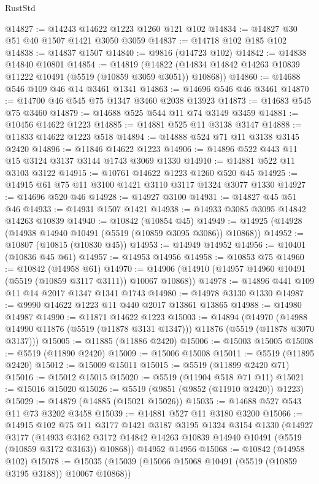 \begin{lexlean}{RustStd}
\begin{coremodule}
@14827 := @14243 @14622 @1223 @1260 @121 @102
@14834 := @14827 @30 @51 @40 @1507 @1421 @3050 @3059
@14837 := @14718 @102 @185 @102
@14838 := @14837 @1507
@14840 := @9816 (@14723 @102)
@14842 := @14838 @14840 @10801
@14854 := @14819
    (@14822 (@14834 @14842 @14263 @10839 @11222 @10491 (@5519 (@10859 @3059 @3051)) @10868))
@14860 := @14688 @546 @109 @46 @14 @3461 @1341
@14863 := @14696 @546 @46 @3461
@14870 := @14700 @46 @545 @75 @1347 @3460 @2038 @13923
@14873 := @14683 @545 @75 @3460
@14879 := @14688 @525 @544 @11 @74 @3149 @3459
@14881 := @10456 @14622 @1223
@14885 := @14881 @525 @11 @3138 @3147
@14888 := @11833 @14622 @1223 @518
@14894 := @14888 @524 @71 @11 @3138 @3145 @2420
@14896 := @11846 @14622 @1223
@14906 := @14896 @522 @443 @11 @15 @3124 @3137 @3144 @1743 @3069 @1330
@14910 := @14881 @522 @11 @3103 @3122
@14915 := @10761 @14622 @1223 @1260 @520 @45
@14925 := @14915 @61 @75 @11 @3100 @1421 @3110 @3117 @1324 @3077 @1330
@14927 := @14696 @520 @46
@14928 := @14927 @3100
@14931 := @14827 @45 @51 @46
@14933 := @14931 @1507 @1421
@14938 := @14933 @3085 @3095 @14842 @14263 @10839
@14940 := @10842 (@10854 @45)
@14949 := @14925 (@14928 (@14938 @14940 @10491 (@5519 (@10859 @3095 @3086)) @10868))
@14952 := @10807 (@10815 (@10830 @45))
@14953 := @14949 @14952
@14956 := @10401 (@10836 @45 @61)
@14957 := @14953 @14956
@14958 := @10853 @75
@14960 := @10842 (@14958 @61)
@14970 := @14906 (@14910 (@14957 @14960 @10491 (@5519 (@10859 @3117 @3111)) @10067 @10868))
@14978 := @14896 @441 @109 @11 @14 @2017 @1347 @1341 @1743
@14980 := @14978 @3130 @1330
@14987 := @9990 @14622 @1223 @11 @440 @2017 @13861 @13865
@14988 := @14980 @14987
@14990 := @11871 @14622 @1223
@15003 := @14894
    (@14970 (@14988 @14990 @11876 (@5519 (@11878 @3131 @1347))) @11876 (@5519 (@11878 @3070 @3137)))
@15005 := @11885 (@11886 @2420)
@15006 := @15003 @15005
@15008 := @5519 (@11890 @2420)
@15009 := @15006 @15008
@15011 := @5519 (@11895 @2420)
@15012 := @15009 @15011
@15015 := @5519 (@11899 @2420 @71)
@15016 := @15012 @15015
@15020 := @5519 (@11904 @518 @71 @11)
@15021 := @15016 @15020
@15026 := @5519 (@9851 (@9852 (@11910 @2420)) @1223)
@15029 := @14879 (@14885 (@15021 @15026))
@15035 := @14688 @527 @543 @11 @73 @3202 @3458
@15039 := @14881 @527 @11 @3180 @3200
@15066 := @14915
    @102
    @75
    @11
    @3177
    @1421
    @3187
    @3195
    @1324
    @3154
    @1330
    (@14927
      @3177
      (@14933 @3162 @3172 @14842 @14263 @10839 @14940 @10491 (@5519 (@10859 @3172 @3163)) @10868))
    @14952
    @14956
@15068 := @10842 (@14958 @102)
@15078 := @15035 (@15039 (@15066 @15068 @10491 (@5519 (@10859 @3195 @3188)) @10067 @10868))

\end{coremodule}
\end{lexlean}
